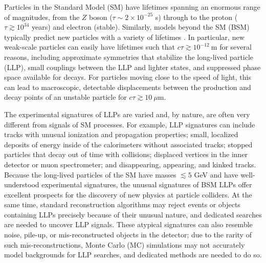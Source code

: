 
\noindent Particles in the Standard Model (SM) have lifetimes spanning an enormous range of magnitudes, from the $Z$ boson ($\tau\sim2\times10^{-25}$ s) through to the proton ($\tau\gtrsim10^{34}$ years) and electron (stable).
Similarly, models beyond the SM (BSM) typically predict new particles with a variety of lifetimes \cite{massive-cite-dump}.
In particular, new weak-scale particles can easily have lifetimes such that $c\tau\gtrsim 10^{-12}~\mathrm{m}$ for several reasons, including approximate symmetries that stabilize the long-lived particle (LLP), small couplings between the LLP and lighter states, and suppressed phase space available for decays.
For particles moving close to the speed of light, this can lead to macroscopic, detectable displacements between the production and decay points of an unstable particle for $c\tau\gtrsim 10~\mu\mathrm{m}$.

The experimental signatures of LLPs are varied and, by nature, are often very different from signals of SM processes.  For example, LLP signatures can include tracks with unusual ionization and propagation properties; small, localized deposits of energy inside of the calorimeters without associated tracks; stopped particles that decay out of time with collisions; displaced vertices in the inner detector or muon spectrometer; and disappearing, appearing, and kinked tracks.
Because the long-lived particles of the SM have masses $\lesssim5$ GeV and have well-understood experimental signatures, the unusual signatures of BSM LLPs offer excellent prospects for the discovery of new physics at particle colliders.
At the same time, standard reconstruction algorithms may reject events or objects containing LLPs precisely because of their unusual nature, and dedicated searches are needed to uncover LLP signals.
These atypical signatures can also resemble noise, pile-up, or mis-reconstructed objects in the detector; due to the rarity of such mis-reconstructions, Monte Carlo (MC) simulations may not accurately model backgrounds for LLP searches, and dedicated methods are needed to do so.

